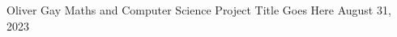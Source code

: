 \documentclass[11pt]{report}
\begin{document}


            {Oliver Gay}
            {Maths and Computer Science}
            {Project Title Goes Here}
            {August 31, 2023}



\newpage
\setcounter{page}{0}





\printbibliography[title={References}]

\appendix

\end{document}
